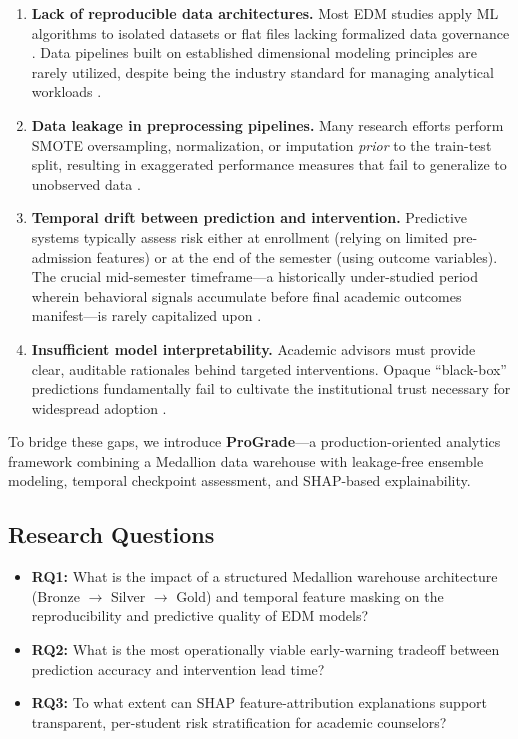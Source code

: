 \documentclass[conference,a4paper]{IEEEtran}
\begin{document}
\begin{enumerate}[leftmargin=*, label=\arabic*)]
\item \textbf{Lack of reproducible data architectures.} Most EDM studies apply ML algorithms to isolated datasets or flat files lacking formalized data governance \cite{romero2020}. Data pipelines built on established dimensional modeling principles \cite{kimball2013dw} are rarely utilized, despite being the industry standard for managing analytical workloads \cite{abelladosantos2019edudw}.

\item \textbf{Data leakage in preprocessing pipelines.} Many research efforts perform SMOTE oversampling, normalization, or imputation \textit{prior} to the train-test split, resulting in exaggerated performance measures that fail to generalize to unobserved data \cite{fernandez2018smotesurvey, chawla2002smote}.

\item \textbf{Temporal drift between prediction and intervention.} Predictive systems typically assess risk either at enrollment (relying on limited pre-admission features) or at the end of the semester (using outcome variables). The crucial mid-semester timeframe---a historically under-studied period wherein behavioral signals accumulate before final academic outcomes manifest---is rarely capitalized upon \cite{marbouti2016ews, aulck2020temporal}.

\item \textbf{Insufficient model interpretability.} Academic advisors must provide clear, auditable rationales behind targeted interventions. Opaque ``black-box'' predictions fundamentally fail to cultivate the institutional trust necessary for widespread adoption \cite{khosravi2022xaiedu, nature2025xai}.
\end{enumerate}

To bridge these gaps, we introduce \textbf{ProGrade}---a production-oriented analytics framework combining a Medallion data warehouse with leakage-free ensemble modeling, temporal checkpoint assessment, and SHAP-based explainability.

\subsection{Research Questions}
\begin{itemize}[leftmargin=*]
\item \textbf{RQ1:} What is the impact of a structured Medallion warehouse architecture (Bronze $\rightarrow$ Silver $\rightarrow$ Gold) and temporal feature masking on the reproducibility and predictive quality of EDM models?
\item \textbf{RQ2:} What is the most operationally viable early-warning tradeoff between prediction accuracy and intervention lead time?
\item \textbf{RQ3:} To what extent can SHAP feature-attribution explanations support transparent, per-student risk stratification for academic counselors?
\end{itemize}
\end{document}
